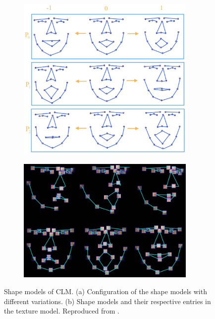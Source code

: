 \begin{figure}[h]
\centering
  \begin{subfigure}[b]{0.5\textwidth}
    \includegraphics[width=0.95\textwidth]{Content/figures/clm-model-variation.jpg}
    \caption{}
    \label{fig:clm-model-variation}
  \end{subfigure}%
  \begin{subfigure}[b]{0.5\textwidth}
    \centering
    \includegraphics[width=0.95\textwidth]{Content/figures/clm-patches.jpg}
    \caption{}
    \label{fig:clm-patches}
  \end{subfigure}
  \caption{Shape models of CLM. (a) Configuration of the shape models with different variations. (b) Shape models and their respective entries in the texture model. Reproduced from \textcite{yu2010facial}.}
  \label{fig:clm-models}
\end{figure}


